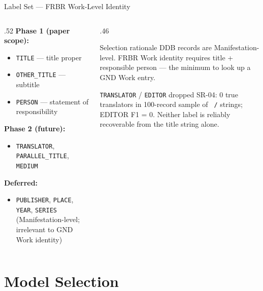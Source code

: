 \documentclass[xcolor,aspectratio=169,compress]{beamer}
\begin{document}
\begin{frame}{Label Set --- FRBR Work-Level Identity}
  \small
  \begin{columns}
    \begin{column}{.52\textwidth}
      \textbf{Phase 1 (paper scope):}
      \begin{itemize}\setlength{\itemsep}{1pt}
        \item \texttt{TITLE} --- title proper
        \item \texttt{OTHER\_TITLE} --- subtitle
        \item \texttt{PERSON} --- statement of responsibility
      \end{itemize}
      \smallskip
      \textbf{Phase 2 (future):}
      \begin{itemize}\setlength{\itemsep}{1pt}
        \item \texttt{TRANSLATOR}, \texttt{PARALLEL\_TITLE}, \texttt{MEDIUM}
      \end{itemize}
      \smallskip
      \textbf{Deferred:}
      \begin{itemize}\setlength{\itemsep}{1pt}
        \item \texttt{PUBLISHER}, \texttt{PLACE}, \texttt{YEAR}, \texttt{SERIES}
              (Manifestation-level; irrelevant to GND Work identity)
      \end{itemize}
    \end{column}
    \begin{column}{.46\textwidth}
      \begin{block}{Selection rationale}
        DDB records are Manifestation-level. FRBR Work identity requires title + responsible person --- the minimum to look up a GND Work entry.
      \end{block}
      \smallskip
      \begin{alertblock}{\texttt{TRANSLATOR} / \texttt{EDITOR} dropped}
        SR-04: 0 true translators in 100-record sample of \texttt{ /} strings; EDITOR F1 = 0.
        Neither label is reliably recoverable from the title string alone.
      \end{alertblock}
    \end{column}
  \end{columns}
\end{frame}

\section{Model Selection}
\end{document}
